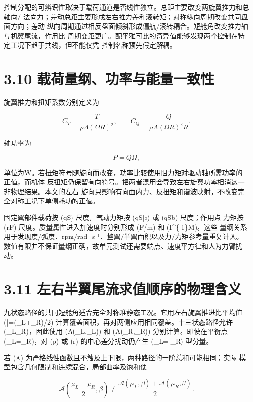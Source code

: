 \documentclass[UTF8,11pt,oneside,openany,fontset=windows]{ctexbook}
\begin{document}
控制分配的可辨识性取决于载荷通道是否线性独立。总距主要改变两旋翼推力和总轴向/
法向力；差动总距主要形成左右推力差和滚转矩；对称纵向周期改变共同盘面方向；差动
纵向周期通过相反盘面倾斜形成偏航/滚转耦合。短舱角改变推力轴与机翼尾流，作用比
周期变距更广。配平雅可比的奇异值能够发现两个控制在特定工况下趋于共线，但不能仅凭
控制名称预先假定解耦。

\section{3.10
载荷量纲、功率与能量一致性}\label{ux8f7dux8377ux91cfux7eb2ux529fux7387ux4e0eux80fdux91cfux4e00ux81f4ux6027}

旋翼推力和扭矩系数分别定义为

\[
C_T=\frac{T}{\rho A(\Omega R)^2},\qquad
C_Q=\frac{Q}{\rho A(\Omega R)^2R}.
\]

轴功率为

\[
P=Q\Omega,
\]

单位为W。若扭矩符号随旋向而改变，功率比较使用阻力矩对驱动轴所需功率的正值，而机体
反扭矩仍保留有向符号。把两者混用会导致左右旋翼功率相消这一非物理结果。本文的左右
旋向只影响有向面内力、反扭矩和谐波映射，不改变完全对称工况下单侧耗功的正值。

固定翼部件载荷按 (qS) 尺度，气动力矩按 (qS\bar c) 或 (qSb) 尺度；作用点
力矩按 (rF) 尺度。质量属性进入加速度时分别形成 (F/m) 和
(I\^{}\{-1\}M)。这些
量纲关系用于发现度/弧度、rpm/rad·s⁻¹、整翼/半翼面积以及力/力矩参考量重复计入。
数值有限并不保证量纲正确，故单元测试还需要端点、速度平方律和人为力臂扰动。

\section{3.11
左右半翼尾流求值顺序的物理含义}\label{ux5de6ux53f3ux534aux7ffcux5c3eux6d41ux6c42ux503cux987aux5e8fux7684ux7269ux7406ux542bux4e49}

九状态路径的共同短舱角适合完全对称准静态工况。它用左右旋翼推进比平均值
(\bar\mu=(\mu\_L+\mu\_R)/2)
计算覆盖面积，再对两侧应用相同覆盖。十三状态路径允许
(\beta\_L\ne\beta\_R)，因此使用 (\mathcal A(\mu\_L,\beta\_L)) 和
(\mathcal A(\mu\_R,\beta\_R)) 分别计算。即使在平衡点
(\beta\_L=\beta\_R)，对 (p) 或 (r) 的中心差分扰动仍产生
(\delta\mu\_L=-\delta\mu\_R) 型分量。

若 (\mathcal A)
为严格线性函数且不触及上下限，两种路径的一阶总和可能相同；实际
模型包含几何限制和连续混合，局部曲率及饱和使

\[
\mathcal A\!\left(\frac{\mu_L+\mu_R}{2},\beta\right)
\ne\frac{\mathcal A(\mu_L,\beta)+\mathcal A(\mu_R,\beta)}{2}.
\]
\end{document}
